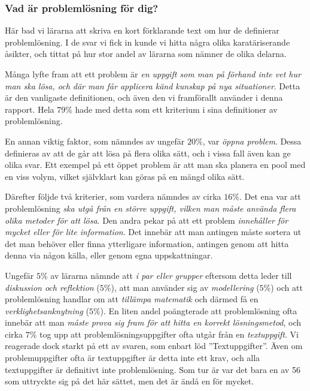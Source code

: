 \subsubsection{Vad är problemlösning för dig?}
\textcolor{lila}{Här bad vi lärarna att skriva en kort förklarande text om hur de definierar problemlösning. I de svar vi fick in kunde vi hitta några olika karatäriserande åsikter, och tittat på hur stor andel av lärarna som nämner de olika delarna.}

\textcolor{lila}{Många lyfte fram att ett problem är \textsl{en uppgift som man på förhand inte vet hur man ska lösa, och där man får applicera känd kunskap på nya situationer}. Detta är den vanligaste definitionen, och även den vi framförallt använder i denna rapport. Hela $79\%$ hade med detta som ett kriterium i sina definitioner av problemlösning.}

\textcolor{lila}{En annan viktig faktor, som nämndes av ungefär $20\%$, var \textsl{öppna problem}. Dessa definieras av att de går att lösa på flera olika sätt, och i vissa fall även kan ge olika svar. Ett exempel på ett öppet problem är att man ska planera en pool med en viss volym, vilket självklart kan göras på en mängd olika sätt.}

\textcolor{lila}{Därefter följde två kriterier, som vardera nämndes av cirka $16\%$. Det ena var att problemlösning \textsl{ska utgå från en större uppgift, vilken man måste använda flera olika metoder för att lösa}. Den andra pekar på att ett problem \textsl{innehåller för mycket eller för lite information}. Det innebär att man antingen måste sortera ut det man behöver eller finna ytterligare information, antingen genom att hitta denna via någon källa, eller genom egna uppskattningar.}

\textcolor{lila}{Ungefär $5\%$ av lärarna nämnde att \textsl{i par eller grupper} eftersom detta leder till \textsl{diskussion och reflektion} ($5\%$), att man använder sig av \textsl{modellering} ($5\%$) och att problemlösning handlar om att \textsl{tillämpa matematik} och därmed få en \textsl{verklighetsanknytning} ($5\%$). En liten andel poängterade att problemlösning ofta innebär att man \textsl{måste prova sig fram för att hitta en korrekt lösningsmetod}, och cirka $7\%$ tog upp att problemlösningsuppgifter ofta utgår från en \textsl{textuppgift}. Vi reagerade dock starkt på ett av svaren, som enbart löd ''Textuppgifter''. Även om problemuppgifter ofta är textuppgifter är detta inte ett krav, och alla textuppgifter är definitivt inte problemlösning. Som tur är var det bara en av 56 som uttryckte sig på det här sättet, men det är ändå en för mycket.}

